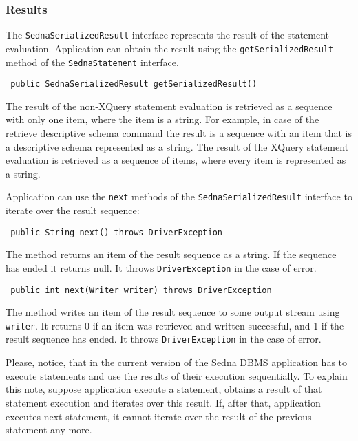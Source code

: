 \documentclass[a4paper,12pt]{article}
\begin{document}
\subsubsection{Results}
\label{sec:results}

The \verb!SednaSerializedResult! interface represents the result of the
statement evaluation. Application can obtain the result using the
\verb!getSerializedResult! method of the \verb!SednaStatement! interface.

\begin{verbatim}
 public SednaSerializedResult getSerializedResult()
\end{verbatim}

The result of the non-XQuery statement evaluation is retrieved as a sequence
with only one item, where the item is a string. For example, in case of the
retrieve descriptive schema command the result is a sequence with an item that
is a descriptive schema represented as a string. The result of the XQuery
statement evaluation is retrieved as a sequence of items, where every item is
represented as a string.

Application can use the \verb!next! methods of the \verb!SednaSerializedResult!
interface to iterate over the result sequence:

\begin{verbatim}
 public String next() throws DriverException
\end{verbatim}

The method returns an item of the result sequence as a string. If the sequence
has ended it returns null. It throws \verb!DriverException! in the case of
error.

\begin{verbatim}
 public int next(Writer writer) throws DriverException
\end{verbatim}

The method writes an item of the result sequence to some output stream using
\verb!writer!. It returns 0 if an item was retrieved and written successful, and
1 if the result sequence has ended. It throws \verb!DriverException! in the case
of error.

Please, notice, that in the current version of the Sedna DBMS application has to
execute statements and use the results of their execution sequentially. To
explain this note, suppose application execute a statement, obtains a result of
that statement execution and iterates over this result. If, after that,
application executes next statement, it cannot iterate over the result of the
previous statement any more.
\end{document}
